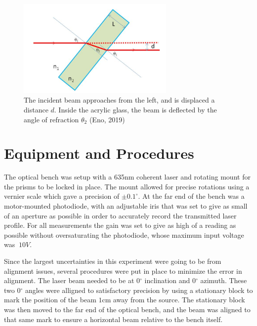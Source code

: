 \documentclass[colorlinks=true,pdfstartview=FitV,linkcolor=blue,
            citecolor=red,urlcolor=magenta]{basedoc}
\begin{document}
    \begin{figure}[!h]
      \begin{center}
      \includegraphics[width=3in]{resources/snells_law.png}
      \caption{The incident beam approaches from the left, and is displaced a distance $d$. Inside the acrylic glass, the beam is deflected by the angle of refraction $\theta_2$ (Eno, 2019)}
      \label{fig:snellslaw}
      \end{center}
    \end{figure}

\section{Equipment and Procedures}

  The optical bench was setup with a 635nm coherent laser and rotating mount for the prisms to be locked in place. The mount allowed for precise rotations using a vernier scale which gave a precision of $\pm0.1^{\circ}$. At the far end of the bench was a motor-mounted photodiode, with an adjustable iris that was set to give as small of an aperture as possible in order to accurately record the transmitted laser profile. For all measurements the gain was set to give as high of a reading as possible without oversaturating the photodiode, whose maximum input voltage was $~10V$.

  Since the largest uncertainties in this experiment were going to be from alignment issues, several procedures were put in place to minimize the error in alignment. The laser beam needed to be at 0$^{\circ}$ inclination and 0$^{\circ}$ azimuth. These two 0$^{\circ}$ angles were alligned to satisfactory precision by using a stationary block to mark the position of the beam $1$cm away from the source. The stationary block was then moved to the far end of the optical bench, and the beam was aligned to that same mark to ensure a horizontal beam relative to the bench itself.
\end{document}

